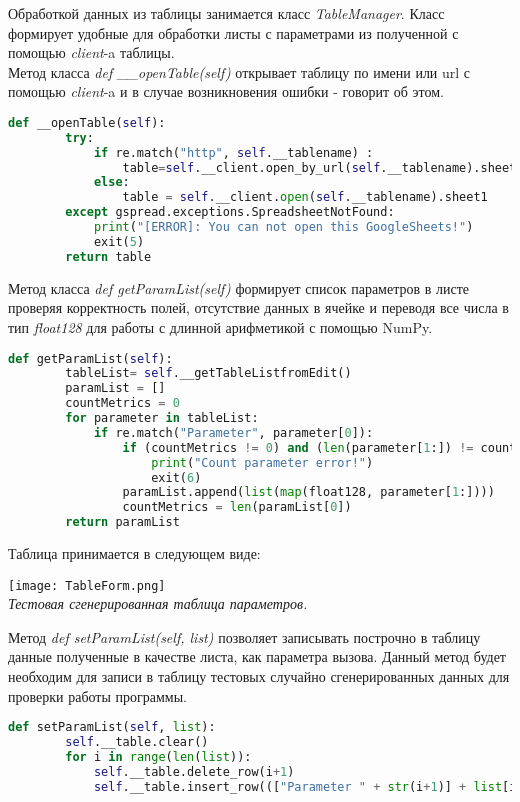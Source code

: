     Обработкой данных из таблицы занимается класс \textit{TableManager}. Класс формирует удобные для обработки листы с параметрами из полученной с помощью \textit{client}-a таблицы.\\
    Метод класса \textit{def \_\_openTable(self)} открывает таблицу по имени или url с помощью \textit{client}-a и в случае возникновения ошибки - говорит об этом.
     \begin{lstlisting}[language=Python]
    def __openTable(self):
        try:
            if re.match("http", self.__tablename) :
                table=self.__client.open_by_url(self.__tablename).sheet1
            else:
                table = self.__client.open(self.__tablename).sheet1
        except gspread.exceptions.SpreadsheetNotFound:
            print("[ERROR]: You can not open this GoogleSheets!")
            exit(5)
        return table
    \end{lstlisting}
    
    Метод класса \textit{def getParamList(self)} формирует список параметров в листе проверяя корректность полей, отсутствие данных в ячейке и переводя все числа в тип \textit{float128} для работы с длинной арифметикой с помощью NumPy.
    \begin{lstlisting}[language=Python]
    def getParamList(self):
        tableList= self.__getTableListfromEdit()
        paramList = []
        countMetrics = 0
        for parameter in tableList:
            if re.match("Parameter", parameter[0]):
                if (countMetrics != 0) and (len(parameter[1:]) != countMetrics):
                    print("Count parameter error!")
                    exit(6)
                paramList.append(list(map(float128, parameter[1:])))
                countMetrics = len(paramList[0])
        return paramList
    \end{lstlisting}
    
    \newpage
    Таблица принимается в следующем виде:
    \begin{center}
        \texttt{[image: TableForm.png]}\\
        \textit{Тестовая сгенерированная таблица параметров.}
    \end{center}
    
    Метод \textit{def setParamList(self, list)} позволяет записывать построчно в таблицу данные полученные в качестве листа, как параметра вызова. Данный метод будет необходим для записи в таблицу тестовых случайно сгенерированных данных для проверки работы программы.
    \begin{lstlisting}[language=Python]
    def setParamList(self, list):
        self.__table.clear()
        for i in range(len(list)):
            self.__table.delete_row(i+1)
            self.__table.insert_row((["Parameter " + str(i+1)] + list[i]), i+1)
    \end{lstlisting}
    
